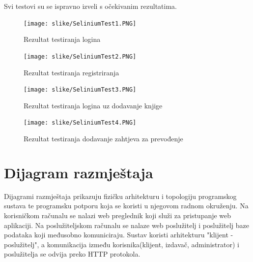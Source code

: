 			

            Svi testovi su se ispravno izveli s očekivanim rezultatima. 
            \eject
			
			
			\begin{figure}[H]
				\texttt{[image: slike/SeliniumTest1.PNG]} %
				\centering
				\caption{Rezultat testiranja logina }
				\label{fig:loginTest1}
			\end{figure}
			
			\eject
            \eject
			
			
			\begin{figure}[H]
				\texttt{[image: slike/SeliniumTest2.PNG]} %
				\centering
				\caption{Rezultat testiranja registriranja }
				\label{fig:registerTest1}
			\end{figure}
			
			\eject
            \eject
			
			
			\begin{figure}[H]
				\texttt{[image: slike/SeliniumTest3.PNG]} %
				\centering
				\caption{Rezultat testiranja logina uz dodavanje knjige}
				\label{fig:addBookTest1}
			\end{figure}
			
			\eject
            \eject
			
			
			\begin{figure}[H]
				\texttt{[image: slike/SeliniumTest4.PNG]} %
				\centering
				\caption{Rezultat testiranja dodavanje zahtjeva za prevođenje}
				\label{fig:testTranslationRequest1}
			\end{figure}
			
			\eject
		
		
		
		\section{Dijagram razmještaja}
			
			Dijagrami razmještaja prikazuju fizičku arhitekturu i topologiju programskog sustava te programsku potporu koja se koristi u njegovom radnom okruženju. Na korisničkom računalu se nalazi web preglednik koji služi za pristupanje web aplikaciji. Na poslužiteljskom računalu se nalaze web poslužitelj i poslužitelj baze podataka koji međusobno komuniciraju. Sustav koristi arhitekturu "klijent - poslužitelj", a komunikacija između korisnika(klijent, izdavač, administrator) i poslužitelja se odvija preko HTTP protokola.
			
